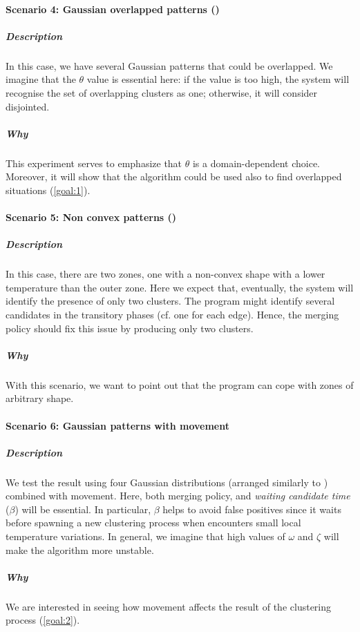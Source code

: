\paragraph{Scenario 4: Gaussian overlapped patterns ()}
\subparagraph{Description}
In this case, we have several Gaussian patterns that could be overlapped. We imagine that the $\theta$ value is essential here:
 if the value is too high, the system will recognise the set of overlapping clusters as one;
 otherwise, it will consider disjointed.
\subparagraph{Why}
This experiment serves to emphasize that $\theta$ is a domain-dependent choice.
 Moreover, it will show that the algorithm could be used also to find overlapped situations (\ref{goal:1}).
\paragraph{Scenario 5: Non convex patterns ()}
\subparagraph{Description}
 In this case, there are two zones, one with a non-convex shape with a lower temperature than the outer zone.
 Here we expect that, eventually, the system will identify the presence of only two clusters.
 The program might identify several candidates in the transitory phases (cf. one for each edge).
 Hence, the merging policy should fix this issue by producing only two clusters.
 \subparagraph{Why} With this scenario, we want to point out that the program can cope with zones of arbitrary shape.
\paragraph{Scenario 6: Gaussian patterns with movement}
\subparagraph{Description}
We test the result using four Gaussian distributions (arranged similarly to ) combined with movement.
 Here, both merging policy, and \emph{waiting candidate time} ($\beta$) will be essential.
 In particular, $\beta$ helps to avoid false positives since it waits before spawning a new clustering process when encounters small local temperature variations.
 In general, we imagine that high values of $\omega$ and $\zeta$ will make the algorithm more unstable.
\subparagraph{Why} We are interested in seeing how movement affects the result of the clustering process (\ref{goal:2}).

